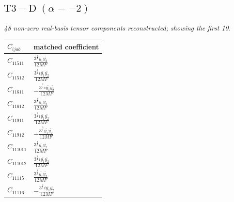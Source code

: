 \documentclass[9pt]{article}
\begin{document}
\subsection*{$ \mathrm{T3-D}\;(\alpha=-2) $}
\textit{48 non-zero real-basis tensor components reconstructed; showing the first 10.}
\begin{longtable}{@{}ll@{}}
\toprule
$C_{ijab}$ & matched coefficient \\
\midrule
$C_{11511}$ & $ \frac{3^{\frac{3}{4}} \overline{y_{1}} \overline{y_{2}}}{12 MF} $ \\
$C_{11512}$ & $ \frac{3^{\frac{3}{4}} i \overline{y_{1}} \overline{y_{2}}}{12 MF} $ \\
$C_{11611}$ & $ - \frac{3^{\frac{3}{4}} i \overline{y_{1}} \overline{y_{2}}}{12 MF} $ \\
$C_{11612}$ & $ \frac{3^{\frac{3}{4}} \overline{y_{1}} \overline{y_{2}}}{12 MF} $ \\
$C_{11911}$ & $ \frac{3^{\frac{3}{4}} i \overline{y_{1}} \overline{y_{2}}}{12 MF} $ \\
$C_{11912}$ & $ - \frac{3^{\frac{3}{4}} \overline{y_{1}} \overline{y_{2}}}{12 MF} $ \\
$C_{111011}$ & $ \frac{3^{\frac{3}{4}} \overline{y_{1}} \overline{y_{2}}}{12 MF} $ \\
$C_{111012}$ & $ \frac{3^{\frac{3}{4}} i \overline{y_{1}} \overline{y_{2}}}{12 MF} $ \\
$C_{11115}$ & $ \frac{3^{\frac{3}{4}} \overline{y_{1}} \overline{y_{2}}}{12 MF} $ \\
$C_{11116}$ & $ - \frac{3^{\frac{3}{4}} i \overline{y_{1}} \overline{y_{2}}}{12 MF} $ \\
\bottomrule
\end{longtable}
\end{document}
